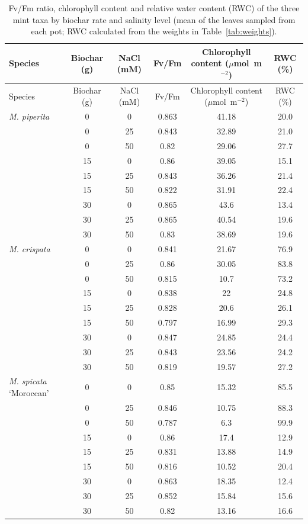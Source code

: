{
\small
\begin{longtable}{p{3cm}cc S[table-format=1.3,round-mode=places,round-precision=3] S[table-format=3.2,round-mode=places,round-precision=2] S[table-format=2.1,round-mode=places,round-precision=1]}
  \caption[Fv/Fm, chlorophyll content and RWC]{Fv/Fm ratio, chlorophyll content and relative water content (RWC) of the three mint taxa by biochar rate and salinity level (mean of the leaves sampled from each pot; RWC calculated from the weights in Table~\ref{tab:weights}).} \label{tab:physiology} \\
  \toprule
  Species & Biochar (g) & NaCl (mM) & {Fv/Fm} & {Chlorophyll content ($\mu$mol~m$^{-2}$)} & {RWC (\%)} \\
  \midrule
  \endfirsthead
  \toprule
  Species & Biochar (g) & NaCl (mM) & {Fv/Fm} & {Chlorophyll content ($\mu$mol~m$^{-2}$)} & {RWC (\%)} \\
  \midrule
  \endhead
  \bottomrule
  \endlastfoot
  \textit{M. piperita} & 0 & 0 & 0.863 & 41.18 & 20.0 \\
   & 0 & 25 & 0.843 & 32.89 & 21.0 \\
   & 0 & 50 & 0.82 & 29.06 & 27.7 \\
   & 15 & 0 & 0.86 & 39.05 & 15.1 \\
   & 15 & 25 & 0.843 & 36.26 & 21.4 \\
   & 15 & 50 & 0.822 & 31.91 & 22.4 \\
   & 30 & 0 & 0.865 & 43.6 & 13.4 \\
   & 30 & 25 & 0.865 & 40.54 & 19.6 \\
   & 30 & 50 & 0.83 & 38.69 & 19.6 \\
  \midrule
  \textit{M. crispata} & 0 & 0 & 0.841 & 21.67 & 76.9 \\
   & 0 & 25 & 0.86 & 30.05 & 83.8 \\
   & 0 & 50 & 0.815 & 10.7 & 73.2 \\
   & 15 & 0 & 0.838 & 22 & 24.8 \\
   & 15 & 25 & 0.828 & 20.6 & 26.1 \\
   & 15 & 50 & 0.797 & 16.99 & 29.3 \\
   & 30 & 0 & 0.847 & 24.85 & 24.4 \\
   & 30 & 25 & 0.843 & 23.56 & 24.2 \\
   & 30 & 50 & 0.819 & 19.57 & 27.2 \\
  \midrule
  \textit{M. spicata} `Moroccan' & 0 & 0 & 0.85 & 15.32 & 85.5 \\
   & 0 & 25 & 0.846 & 10.75 & 88.3 \\
   & 0 & 50 & 0.787 & 6.3 & 99.9 \\
   & 15 & 0 & 0.86 & 17.4 & 12.9 \\
   & 15 & 25 & 0.831 & 13.88 & 14.9 \\
   & 15 & 50 & 0.816 & 10.52 & 20.4 \\
   & 30 & 0 & 0.863 & 18.35 & 12.4 \\
   & 30 & 25 & 0.852 & 15.84 & 15.6 \\
   & 30 & 50 & 0.82 & 13.16 & 16.6 \\
\end{longtable}
}

